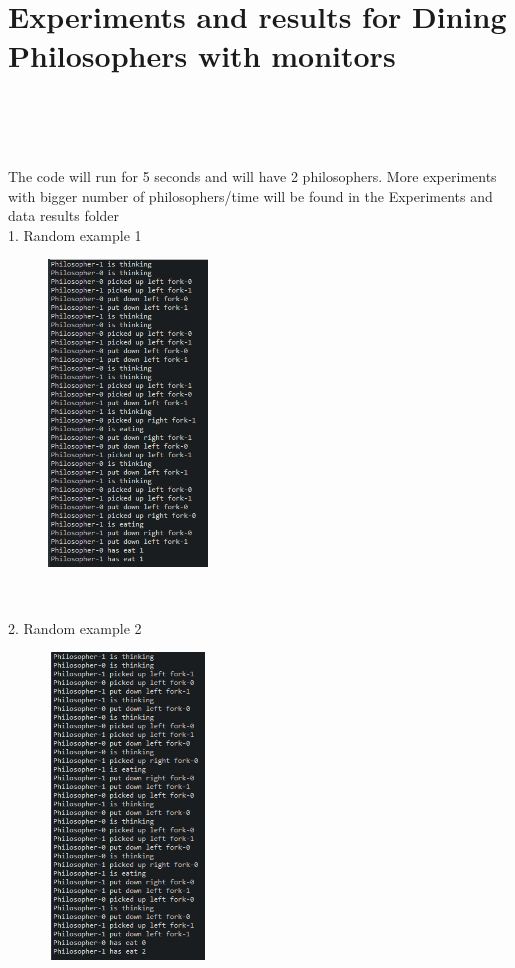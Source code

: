 \documentclass[14pt]{article}
\begin{document}
\section*{Experiments and results for Dining Philosophers with monitors}
\\\\\\
\begin{center}
The code will run for 5 seconds and will have 2 philosophers. More experiments with bigger number of philosophers/time will be found in the Experiments and data results folder\\
1. Random example 1\\
\vspace{10mm}

\includegraphics[height=3.2in, width = 2.5in]{philomon1.png}\\
\end{center}\\
\begin{center}
2. Random example 2\\
\vspace{10mm}

\includegraphics[height=3.2in, width = 2.5in]{philomon2.png}\\
\end{center}\\
\end{document}
